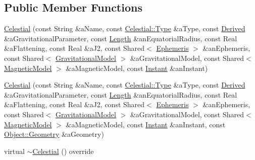 \subsection*{Public Member Functions}
\begin{DoxyCompactItemize}
\item 
\hyperlink{classostk_1_1physics_1_1env_1_1obj_1_1_celestial_a428093b00b3f96d733426a168b344984}{Celestial} (const String \&a\+Name, const \hyperlink{classostk_1_1physics_1_1env_1_1obj_1_1_celestial_aa0711d887522b35b2b3630156d912779}{Celestial\+::\+Type} \&a\+Type, const \hyperlink{classostk_1_1physics_1_1units_1_1_derived}{Derived} \&a\+Gravitational\+Parameter, const \hyperlink{classostk_1_1physics_1_1units_1_1_length}{Length} \&an\+Equatorial\+Radius, const Real \&a\+Flattening, const Real \&a\+J2, const Shared$<$ \hyperlink{classostk_1_1physics_1_1env_1_1_ephemeris}{Ephemeris} $>$ \&an\+Ephemeris, const Shared$<$ \hyperlink{namespaceostk_1_1physics_1_1env_1_1obj_a50c0bc72e8880f2fa2a910a81e050c97}{Gravitational\+Model} $>$ \&a\+Gravitational\+Model, const Shared$<$ \hyperlink{namespaceostk_1_1physics_1_1env_1_1obj_a11552c1290e2f6b4693ea00c2df2c80d}{Magnetic\+Model} $>$ \&a\+Magnetic\+Model, const \hyperlink{classostk_1_1physics_1_1time_1_1_instant}{Instant} \&an\+Instant)
\item 
\hyperlink{classostk_1_1physics_1_1env_1_1obj_1_1_celestial_a9519c2dacaeaf7b67fa7cae77eab427e}{Celestial} (const String \&a\+Name, const \hyperlink{classostk_1_1physics_1_1env_1_1obj_1_1_celestial_aa0711d887522b35b2b3630156d912779}{Celestial\+::\+Type} \&a\+Type, const \hyperlink{classostk_1_1physics_1_1units_1_1_derived}{Derived} \&a\+Gravitational\+Parameter, const \hyperlink{classostk_1_1physics_1_1units_1_1_length}{Length} \&an\+Equatorial\+Radius, const Real \&a\+Flattening, const Real \&a\+J2, const Shared$<$ \hyperlink{classostk_1_1physics_1_1env_1_1_ephemeris}{Ephemeris} $>$ \&an\+Ephemeris, const Shared$<$ \hyperlink{namespaceostk_1_1physics_1_1env_1_1obj_a50c0bc72e8880f2fa2a910a81e050c97}{Gravitational\+Model} $>$ \&a\+Gravitational\+Model, const Shared$<$ \hyperlink{namespaceostk_1_1physics_1_1env_1_1obj_a11552c1290e2f6b4693ea00c2df2c80d}{Magnetic\+Model} $>$ \&a\+Magnetic\+Model, const \hyperlink{classostk_1_1physics_1_1time_1_1_instant}{Instant} \&an\+Instant, const \hyperlink{classostk_1_1physics_1_1env_1_1_object_a66e44a65aefb23a184a6de531e96935d}{Object\+::\+Geometry} \&a\+Geometry)
\item 
virtual \hyperlink{classostk_1_1physics_1_1env_1_1obj_1_1_celestial_aadbeb101aaa4c4acb136278385d2080b}{$\sim$\+Celestial} () override

\end{DoxyCompactItemize}
